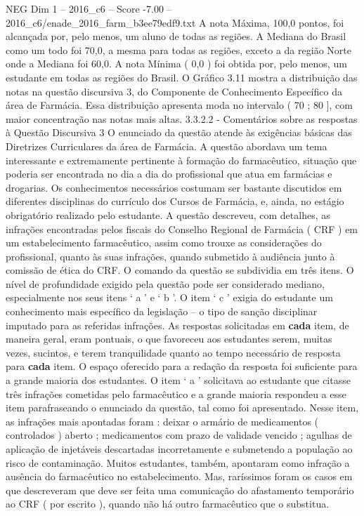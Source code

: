 \begin{textsample}{NEG Dim 1 – 2016\_c6 – Score -7.00 – 2016\_c6/enade\_2016\_farm\_b3ee79edf9.txt}
A nota Máxima, 100,0 pontos, foi alcançada por, pelo menos, um aluno de todas as regiões.
A Mediana do Brasil como um todo foi 70,0, a mesma para todas as regiões, exceto a da região Norte onde a Mediana foi 60,0.
A nota Mínima ( 0,0 ) foi obtida por, pelo menos, um estudante em todas as regiões do Brasil.
O Gráfico 3.11 mostra a distribuição das notas na questão discursiva 3, do Componente de Conhecimento Específico da área de Farmácia.
Essa distribuição apresenta moda no intervalo ( 70 ; 80 ], com maior concentração nas notas mais altas. 3.3.2.2 - Comentários sobre as respostas à Questão Discursiva 3 O enunciado da questão atende às exigências básicas das Diretrizes Curriculares da área de Farmácia.
A questão abordava um tema interessante e extremamente pertinente à formação do farmacêutico, situação que poderia ser encontrada no dia a dia do profissional que atua em farmácias e drogarias.
Os conhecimentos necessários costumam ser bastante discutidos em diferentes disciplinas do currículo dos Cursos de Farmácia, e, ainda, no estágio obrigatório realizado pelo estudante.
A questão descreveu, com detalhes, as infrações encontradas pelos fiscais do Conselho Regional de Farmácia ( CRF ) em um estabelecimento farmacêutico, assim como trouxe as considerações do profissional, quanto às suas infrações, quando submetido à audiência junto à comissão de ética do CRF.
O comando da questão se subdividia em três itens.
O nível de profundidade exigido pela questão pode ser considerado mediano, especialmente nos seus itens ‘ a ’ e ‘ b ’.
O item ‘ c ’ exigia do estudante um conhecimento mais específico da legislação – o tipo de sanção disciplinar imputado para as referidas infrações.
As respostas solicitadas em \textbf{cada} item, de maneira geral, eram pontuais, o que favoreceu aos estudantes serem, muitas vezes, sucintos, e terem tranquilidade quanto ao tempo necessário de resposta para \textbf{cada} item.
O espaço oferecido para a redação da resposta foi suficiente para a grande maioria dos estudantes.
O item ‘ a ’ solicitava ao estudante que citasse três infrações cometidas pelo farmacêutico e a grande maioria respondeu a esse item parafraseando o enunciado da questão, tal como foi apresentado.
Nesse item, as infrações mais apontadas foram : deixar o armário de medicamentos ( controlados ) aberto ; medicamentos com prazo de validade vencido ; agulhas de aplicação de injetáveis descartadas incorretamente e submetendo a população ao risco de contaminação.
Muitos estudantes, também, apontaram como infração a ausência do farmacêutico no estabelecimento.
Mas, raríssimos foram os casos em que descreveram que deve ser feita uma comunicação do afastamento temporário ao CRF ( por escrito ), quando não há outro farmacêutico que o substitua.

\end{textsample}
